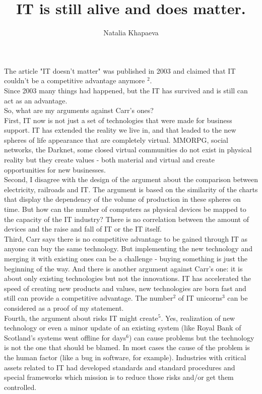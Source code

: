 \documentclass[7pt]{article}
\title{IT is still alive and does matter.}
\author{Natalia Khapaeva}
\begin{document}
\maketitle
\footnotesize

The article "IT doesn't matter" was published in 2003 and claimed that IT couldn't be a competitive advantage anymore $^2$.\\
Since 2003 many things had happened, but the IT has survived and is still can act as an advantage. \\

\noindent
So, what are my arguments against Carr's ones?\\
\noindent
First, IT now is not just a set of technologies that were made for business support. IT has extended the reality we live in, and that leaded to the new spheres of life appearance that are completely virtual. MMORPG, social networks, the Darknet, some closed virtual communities do not exist in physical reality but they create values - both material and virtual and create opportunities for new
businesses.\\

\noindent
Second, I disagree with the design of the argument about the comparison between electricity, railroads and IT. The argument is based on the similarity of the charts that display the dependency of the volume of production in these spheres on time. But how can the number of computers as physical devices be mapped to the capacity of the IT industry? There is no correlation between the amount of devices and the raise and fall of IT or the IT itself. \\

\noindent
Third, Carr says there is no competitive advantage to be gained through IT as anyone can buy the same technology. But implementing the new technology and merging it with existing ones can be a challenge - buying something is just the beginning of the way. And there is another argument against Carr's one: it is about only existing technologies but not the innovations. IT has accelerated the speed of creating new products and values, new technologies are born fast and still can provide a competitive advantage. The number$^2$ of IT unicorns$^3$ can be considered as a proof of my statement. \\

\noindent
Fourth, the argument about risks IT might create$^5$. Yes, realization of new technology or even a minor update of an existing system (like Royal Bank of Scotland’s systems went offline for days$^6$) can cause problems but the technology is not the one that should be blamed. In most cases the cause of the problem is the human factor (like a bug in software, for example). Industries with critical assets related to IT had developed standards and standard procedures and special frameworks which mission is to reduce those risks and/or get them controlled.\\
\end{document}
